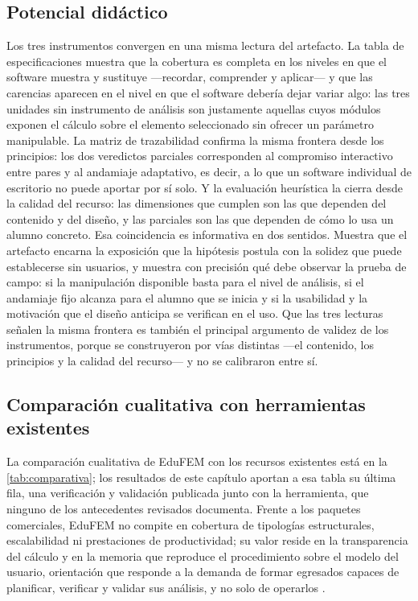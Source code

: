 \subsection{Potencial didáctico}

Los tres instrumentos convergen en una misma lectura del artefacto. La tabla de especificaciones muestra que la cobertura es completa en los niveles en que el software muestra y sustituye —recordar, comprender y aplicar— y que las carencias aparecen en el nivel en que el software debería dejar variar algo: las tres unidades sin instrumento de análisis son justamente aquellas cuyos módulos exponen el cálculo sobre el elemento seleccionado sin ofrecer un parámetro manipulable. La matriz de trazabilidad confirma la misma frontera desde los principios: los dos veredictos parciales corresponden al compromiso interactivo entre pares y al andamiaje adaptativo, es decir, a lo que un software individual de escritorio no puede aportar por sí solo. Y la evaluación heurística la cierra desde la calidad del recurso: las dimensiones que cumplen son las que dependen del contenido y del diseño, y las parciales son las que dependen de cómo lo usa un alumno concreto. Esa coincidencia es informativa en dos sentidos. Muestra que el artefacto encarna la exposición que la hipótesis postula con la solidez que puede establecerse sin usuarios, y muestra con precisión qué debe observar la prueba de campo: si la manipulación disponible basta para el nivel de análisis, si el andamiaje fijo alcanza para el alumno que se inicia y si la usabilidad y la motivación que el diseño anticipa se verifican en el uso. Que las tres lecturas señalen la misma frontera es también el principal argumento de validez de los instrumentos, porque se construyeron por vías distintas —el contenido, los principios y la calidad del recurso— y no se calibraron entre sí.

\subsection{Comparación cualitativa con herramientas existentes}

La comparación cualitativa de EduFEM con los recursos existentes está en la \autoref{tab:comparativa}; los resultados de este capítulo aportan a esa tabla su última fila, una verificación y validación publicada junto con la herramienta, que ninguno de los antecedentes revisados documenta. Frente a los paquetes comerciales, EduFEM no compite en cobertura de tipologías estructurales, escalabilidad ni prestaciones de productividad; su valor reside en la transparencia del cálculo y en la memoria que reproduce el procedimiento sobre el modelo del usuario, orientación que responde a la demanda de formar egresados capaces de planificar, verificar y validar sus análisis, y no solo de operarlos \autocite[pp.~1159, 1168]{perezsantiago2023fem}.

